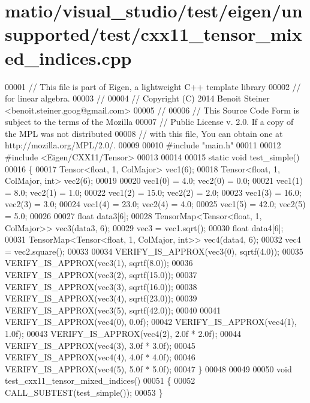 \hypertarget{matio_2visual__studio_2test_2eigen_2unsupported_2test_2cxx11__tensor__mixed__indices_8cpp_source}{}\section{matio/visual\+\_\+studio/test/eigen/unsupported/test/cxx11\+\_\+tensor\+\_\+mixed\+\_\+indices.cpp}
\label{matio_2visual__studio_2test_2eigen_2unsupported_2test_2cxx11__tensor__mixed__indices_8cpp_source}

\begin{DoxyCode}
00001 \textcolor{comment}{// This file is part of Eigen, a lightweight C++ template library}
00002 \textcolor{comment}{// for linear algebra.}
00003 \textcolor{comment}{//}
00004 \textcolor{comment}{// Copyright (C) 2014 Benoit Steiner <benoit.steiner.goog@gmail.com>}
00005 \textcolor{comment}{//}
00006 \textcolor{comment}{// This Source Code Form is subject to the terms of the Mozilla}
00007 \textcolor{comment}{// Public License v. 2.0. If a copy of the MPL was not distributed}
00008 \textcolor{comment}{// with this file, You can obtain one at http://mozilla.org/MPL/2.0/.}
00009 
00010 \textcolor{preprocessor}{#include "main.h"}
00011 
00012 \textcolor{preprocessor}{#include <Eigen/CXX11/Tensor>}
00013 
00014 
00015 \textcolor{keyword}{static} \textcolor{keywordtype}{void} test\_simple()
00016 \{
00017   Tensor<float, 1, ColMajor> vec1(6);
00018   Tensor<float, 1, ColMajor, int> vec2(6);
00019 
00020   vec1(0) = 4.0;  vec2(0) = 0.0;
00021   vec1(1) = 8.0;  vec2(1) = 1.0;
00022   vec1(2) = 15.0; vec2(2) = 2.0;
00023   vec1(3) = 16.0; vec2(3) = 3.0;
00024   vec1(4) = 23.0; vec2(4) = 4.0;
00025   vec1(5) = 42.0; vec2(5) = 5.0;
00026 
00027   \textcolor{keywordtype}{float} data3[6];
00028   TensorMap<Tensor<float, 1, ColMajor>> vec3(data3, 6);
00029   vec3 = vec1.sqrt();
00030   \textcolor{keywordtype}{float} data4[6];
00031   TensorMap<Tensor<float, 1, ColMajor, int>> vec4(data4, 6);
00032   vec4 = vec2.square();
00033 
00034   VERIFY\_IS\_APPROX(vec3(0), sqrtf(4.0));
00035   VERIFY\_IS\_APPROX(vec3(1), sqrtf(8.0));
00036   VERIFY\_IS\_APPROX(vec3(2), sqrtf(15.0));
00037   VERIFY\_IS\_APPROX(vec3(3), sqrtf(16.0));
00038   VERIFY\_IS\_APPROX(vec3(4), sqrtf(23.0));
00039   VERIFY\_IS\_APPROX(vec3(5), sqrtf(42.0));
00040 
00041   VERIFY\_IS\_APPROX(vec4(0), 0.0f);
00042   VERIFY\_IS\_APPROX(vec4(1), 1.0f);
00043   VERIFY\_IS\_APPROX(vec4(2), 2.0f * 2.0f);
00044   VERIFY\_IS\_APPROX(vec4(3), 3.0f * 3.0f);
00045   VERIFY\_IS\_APPROX(vec4(4), 4.0f * 4.0f);
00046   VERIFY\_IS\_APPROX(vec4(5), 5.0f * 5.0f);
00047 \}
00048 
00049 
00050 \textcolor{keywordtype}{void} test\_cxx11\_tensor\_mixed\_indices()
00051 \{
00052   CALL\_SUBTEST(test\_simple());
00053 \}
\end{DoxyCode}
